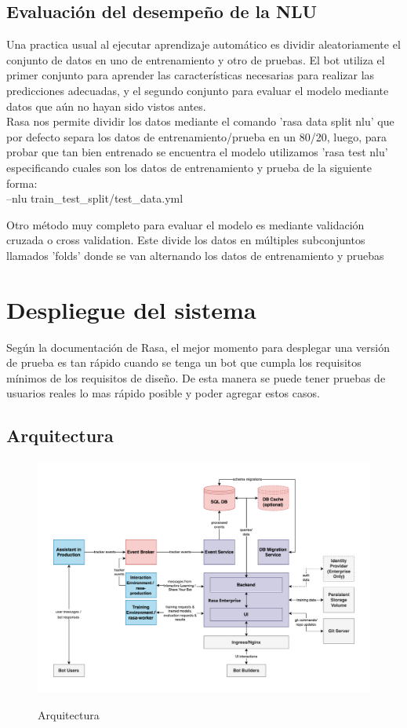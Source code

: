 \subsection{Evaluación del desempeño de la NLU}
Una practica usual al ejecutar aprendizaje automático es dividir aleatoriamente el conjunto de
datos en uno de entrenamiento y otro de pruebas. El bot utiliza el primer conjunto para aprender
las características necesarias para realizar las predicciones adecuadas, y el segundo conjunto para
evaluar el modelo mediante datos que aún no hayan sido vistos antes.\\
Rasa nos permite dividir los datos mediante el comando 'rasa data split nlu' que por defecto separa
los datos de entrenamiento/prueba en un 80/20, luego, para probar que tan bien entrenado se
encuentra el modelo utilizamos 'rasa test nlu' especificando cuales son los datos de entrenamiento
y prueba de la siguiente forma:\\
--nlu train\_test\_split/test\_data.yml

Otro método muy completo para evaluar el modelo es mediante validación cruzada o cross validation.
Este divide los datos en múltiples subconjuntos llamados 'folds' donde se van alternando los datos
de entrenamiento y pruebas

\section{Despliegue del sistema}
Según la documentación de Rasa, el mejor momento para desplegar una versión de prueba es tan rápido
cuando
se tenga un bot que cumpla los requisitos mínimos de los requisitos de diseño. De esta manera se
puede
tener pruebas de usuarios reales lo mas rápido posible y poder agregar estos casos.

\subsection{Arquitectura}

\begin{figure}[h]
	\centering
	\includegraphics[width=\textwidth]{imagenes/cap3/architecture_deploy.png}
	\caption{Arquitectura}
	\label{fig:deploy-architecture}
	\cite{Rasa}
\end{figure}

